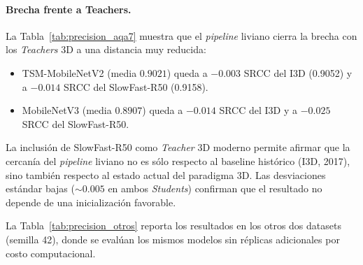 \paragraph{Brecha frente a Teachers.} La Tabla~\ref{tab:precision_aqa7} muestra que el \textit{pipeline} liviano cierra la brecha con los \textit{Teachers} 3D a una distancia muy reducida:

\begin{itemize}
    \item TSM-MobileNetV2 (media $0.9021$) queda a $-0.003$ \ac{SRCC} del \ac{I3D} (0.9052) y a $-0.014$ \ac{SRCC} del SlowFast-R50 (0.9158).
    \item MobileNetV3 (media $0.8907$) queda a $-0.014$ \ac{SRCC} del \ac{I3D} y a $-0.025$ \ac{SRCC} del SlowFast-R50.
\end{itemize}

La inclusión de SlowFast-R50 como \textit{Teacher} 3D moderno permite afirmar que la cercanía del \textit{pipeline} liviano no es sólo respecto al baseline histórico (\ac{I3D}, 2017), sino también respecto al estado actual del paradigma 3D. Las desviaciones estándar bajas ($\sim 0.005$ en ambos \textit{Students}) confirman que el resultado no depende de una inicialización favorable.

La Tabla~\ref{tab:precision_otros} reporta los resultados en los otros dos datasets (semilla 42), donde se evalúan los mismos modelos sin réplicas adicionales por costo computacional.

